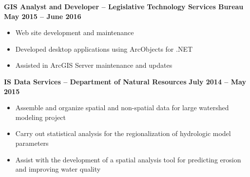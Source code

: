 \documentclass{article}
\begin{document}
\begin{small}
	\noindent \textbf{GIS Analyst and Developer -- Legislative Technology Services Bureau} \hfill \textbf{May 2015 -- June 2016}
	\begin{itemize}
		\item Web site development and maintenance
		\item Developed desktop applications using ArcObjects for .NET
		\item Assisted in ArcGIS Server maintenance and updates
	\end{itemize}
	\noindent \textbf{IS Data Services -- Department of Natural Resources} \hfill \textbf{July 2014 -- May 2015}
	\begin{itemize}
		\item Assemble and organize spatial and non-spatial data for large watershed modeling project
		\item Carry out statistical analysis for the regionalization of hydrologic model parameters
		\item Assist with the development of a spatial analysis tool 
		 for predicting erosion and improving water quality
	\end{itemize}

\end{small}
\end{document}
